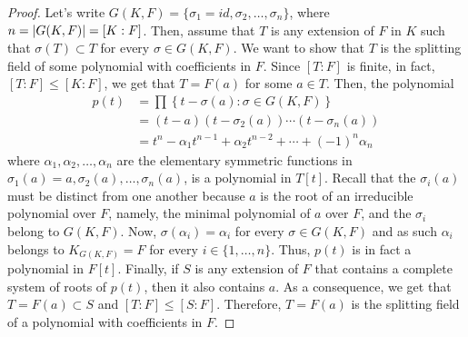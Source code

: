 \begin{proof}
  Let's write $G(K,F)=\{\sigma_{1}=id,\sigma_{2},\ldots,\sigma_{n}\}$, where $n=\lvert G(K,F)\rvert=[K:F]$. Then, assume that $T$ is any extension of $F$ in $K$ such that $\sigma(T)\subset{T}$ for every ${\sigma}\in{G(K,F)}$. We want to show that $T$ is the splitting field of some polynomial with coefficients in $F$. Since $[T:F]$ is finite, in fact, $[T:F]\leqslant{[K:F]}$, we get that $T=F(a)$ for some ${a}\in{T}$. Then, the polynomial
  \begin{align*}
    p(t)
    &=
    \prod\left\{t-\sigma(a):{\sigma}\in{G(K,F)}\right\}
    \\
    &=
    (t-a)(t-\sigma_{2}(a))\cdots(t-\sigma_{n}(a))
    \\
    &=
    t^{n}-\alpha_{1}t^{n-1}+\alpha_{2}t^{n-2}+\cdots+(-1)^{n}\alpha_{n}
  \end{align*}
  where $\alpha_{1},\alpha_{2},\ldots,\alpha_{n}$ are the elementary symmetric functions in $\sigma_{1}(a)=a,\sigma_{2}(a),\ldots,\sigma_{n}(a)$, is a polynomial in $T[t]$. Recall that the $\sigma_{i}(a)$ must be distinct from one another because $a$ is the root of an irreducible polynomial over $F$, namely, the minimal polynomial of $a$ over $F$, and the $\sigma_{i}$ belong to $G(K,F)$. Now, $\sigma(\alpha_{i})=\alpha_{i}$ for every ${\sigma}\in{G(K,F)}$ and as such $\alpha_{i}$ belongs to $K_{G(K,F)}=F$ for every ${i}\in{\{1,\ldots,n\}}$. Thus, $p(t)$ is in fact a polynomial in $F[t]$. Finally, if $S$ is any extension of $F$ that contains a complete system of roots of $p(t)$, then it also contains $a$. As a consequence, we get that $T=F(a)\subset{S}$ and $[T:F]\leqslant{[S:F]}$. Therefore, $T=F(a)$ is the splitting field of a polynomial with coefficients in $F$.


\end{proof}
